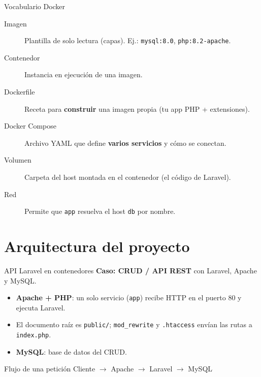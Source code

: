 \documentclass[aspectratio=169,10pt]{beamer}
\begin{document}
\begin{frame}{Vocabulario Docker}
  \begin{description}
    \item[Imagen] Plantilla de solo lectura (capas). Ej.: \texttt{mysql:8.0}, \texttt{php:8.2-apache}.
    \item[Contenedor] Instancia en ejecución de una imagen.
    \item[Dockerfile] Receta para \textbf{construir} una imagen propia (tu app PHP + extensiones).
    \item[Docker Compose] Archivo YAML que define \textbf{varios servicios} y cómo se conectan.
    \item[Volumen] Carpeta del host montada en el contenedor (el código de Laravel).
    \item[Red] Permite que \texttt{app} resuelva el host \texttt{db} por nombre.
  \end{description}
\end{frame}

\section{Arquitectura del proyecto}

\begin{frame}{API Laravel en contenedores}
  \textbf{Caso: CRUD / API REST} con Laravel, Apache y MySQL.
  \vspace{0.5em}
  \begin{itemize}
    \item \textbf{Apache + PHP}: un solo servicio (\texttt{app}) recibe HTTP en el puerto 80 y ejecuta Laravel.
    \item El documento raíz es \texttt{public/}; \texttt{mod\_rewrite} y \texttt{.htaccess} envían las rutas a \texttt{index.php}.
    \item \textbf{MySQL}: base de datos del CRUD.
  \end{itemize}
  \vspace{0.5em}
  \begin{alertblock}{Flujo de una petición}
    Cliente $\rightarrow$ Apache $\rightarrow$ Laravel $\rightarrow$ MySQL
  \end{alertblock}
\end{frame}
\end{document}
